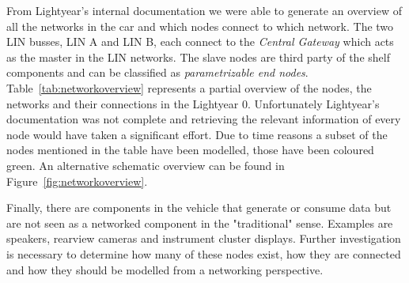 From Lightyear's internal documentation we were able to generate an overview of all the networks in the car and which nodes connect to which network. The two LIN busses, LIN A and LIN B, each connect to the \textit{Central Gateway} which acts as the master in the LIN networks. The slave nodes are third party of the shelf components and can be classified as \textit{parametrizable end nodes}. Table~\ref{tab:networkoverview} represents a partial overview of the nodes, the networks and their connections in the Lightyear 0. Unfortunately Lightyear's documentation was not complete and retrieving the relevant information of every node would have taken a significant effort. Due to time reasons a subset of the nodes mentioned in the table have been modelled, those have been coloured green. An alternative schematic overview can be found in Figure~\ref{fig:networkoverview}.

Finally, there are components in the vehicle that generate or consume data but are not seen as a networked component in the "traditional" sense. Examples are speakers, rearview cameras and instrument cluster displays. Further investigation is necessary to determine how many of these nodes exist, how they are connected and how they should be modelled from a networking perspective.



\clearpage